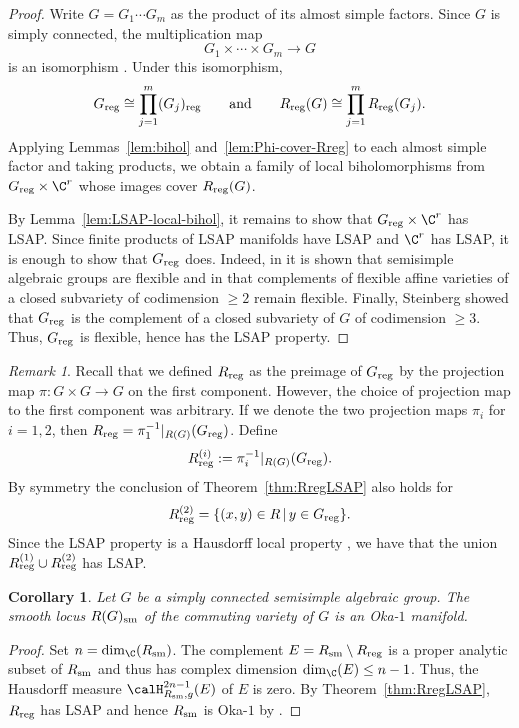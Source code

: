 \documentclass[12pt, a4paper, oneside]{amsart}
\theoremstyle{plain} %
\newtheorem{corollary}[theorem]{Corollary}
\theoremstyle{definition} %
\theoremstyle{remark} %
\newtheorem{remark}[theorem]{Remark}
\begin{document}
\begin{proof}
Write $G=G_1\cdots G_m$ as the product of its almost simple factors. Since $G$ is simply connected, the multiplication map
\[
G_1\times\cdots\times G_m\longrightarrow G
\]
is an isomorphism \cite[\S 24a]{Mil17}. Under this isomorphism,
\[
G_{\rm reg}\cong\prod_{j=1}^m (G_j)_{\rm reg}
\qquad\text{and}\qquad
R_{\rm reg}(G)\cong\prod_{j=1}^m R_{\rm reg}(G_j).
\]
Applying Lemmas~\ref{lem:bihol} and~\ref{lem:Phi-cover-Rreg} to each almost simple factor and taking products, we obtain a family of local biholomorphisms from $G_{\rm reg}\times\C^r$ whose images cover $R_{\rm reg}(G)$.

By Lemma~\ref{lem:LSAP-local-bihol}, it remains to show that $G_{\rm reg}\times \C^r$ has LSAP. Since finite products of LSAP manifolds have LSAP and $\C^r$ has LSAP, it is enough to show that $G_{\rm reg}$ does. Indeed, in \cite[Proposition 1.1]{AZK12} it is shown that semisimple algebraic groups are flexible and in \cite[Theorem 1.1]{FKZ16} that complements of flexible affine varieties of a closed subvariety of codimension $\geq 2$ remain flexible. Finally, Steinberg \cite[Theorem 1.3 (a) and (b)]{Ste65} showed that $G_{\rm reg}$ is the complement of a closed subvariety of $G$ of codimension $\geq 3$. Thus, $G_{\rm reg}$ is flexible, hence has the LSAP property.
 \end{proof}
\begin{remark}
Recall that we defined $R_{\rm reg}$ as the preimage of $G_{\rm reg}$ by the projection map $\pi:G\times G\to G$ on the first component. However, the choice of projection map to the first component was arbitrary. If we denote the two projection maps $\pi_i$ for $i=1,2$, then $R_{\rm reg} = \pi^{-1}_{1}|_{R(G)}(G_{\rm reg})$. Define
\[R_{\rm reg}^{(i)} := \pi_i^{-1}|_{R(G)}(G_{\rm reg}).\]
By symmetry the conclusion of Theorem~\ref{thm:RregLSAP} also holds for 
\[R_{\rm reg}^{(2)} = \{(x,y)\in R\,|\, y\in G_{\rm reg}\}.\]
Since the LSAP property is a Hausdorff local property \cite[Proposition 5.5]{FL25}, we have that the union $R^{(1)}_{\rm reg}\cup R^{(2)}_{\rm reg}$ has LSAP. 
\end{remark}
\begin{corollary}\label{cor:mainresult} Let $G$ be a simply connected semisimple algebraic group. The smooth locus $R(G)_{\rm sm}$ of the commuting variety of $G$ is an Oka-$1$ manifold.
\end{corollary}
\begin{proof}
Set $n= \dim_\C(R_{\rm sm})$. The complement $E =R_{\rm sm}\setminus R_{\rm reg}$ is a proper analytic subset of $R_{\rm sm}$ and thus has complex dimension $\dim_\C(E)\leq n-1$. Thus, the Hausdorff measure $\calH^{2n-1}_{R_{\rm sm},g}(E)$ of $E$ is zero. By Theorem~\ref{thm:RregLSAP}, $R_{\rm reg}$ has LSAP and hence $R_{\rm sm}$ is Oka-$1$ by \cite[Proposition 7.13  (b)]{AF25}.
\end{proof}
\end{document}
